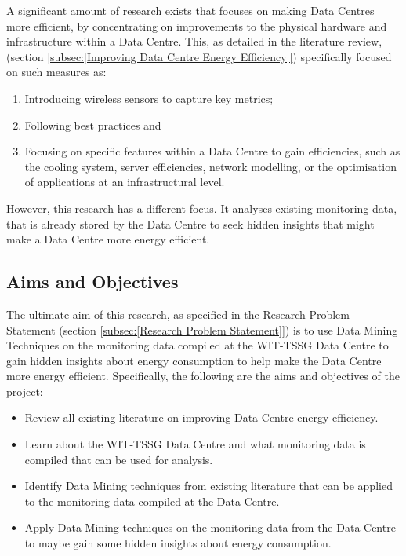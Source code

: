 \documentclass[12pt]{scrartcl}
\begin{document}
A significant amount of research exists that focuses on making Data Centres more efficient, by concentrating on improvements to the physical hardware and infrastructure within a Data Centre. This, as detailed in the literature review, (section \ref{subsec:[Improving Data Centre Energy Efficiency]}) specifically focused on such measures as: 

\begin{enumerate}
	\item Introducing wireless sensors to capture key metrics;
	\item Following best practices and 
	\item Focusing on specific features within a Data Centre to gain efficiencies, such as the cooling system, server efficiencies, network modelling, or the optimisation of applications at an infrastructural level. 
\end{enumerate}

However, this research has a different focus. It analyses existing monitoring data, that is already stored by the Data Centre to seek hidden insights that might make a Data Centre more energy efficient. 

\subsection{Aims and Objectives}
\label{subsec:[Aims and Objective]}

The ultimate aim of this research, as specified in the Research Problem Statement (section \ref{subsec:[Research Problem Statement]}) is to use Data Mining Techniques on the monitoring data compiled at the WIT-TSSG Data Centre to gain hidden insights about energy consumption to help make the Data Centre more energy efficient. 
Specifically, the following are the aims and objectives of the project:

\begin{itemize}
\item Review all existing literature on improving Data Centre energy efficiency.
\item Learn about the WIT-TSSG Data Centre and what monitoring data is compiled that can be used for analysis.
\item Identify Data Mining techniques from existing literature that can be applied to the monitoring data compiled at the Data Centre.
\item Apply Data Mining techniques on the monitoring data from the Data Centre to maybe gain some hidden insights about energy consumption.
\end{itemize}
\end{document}
